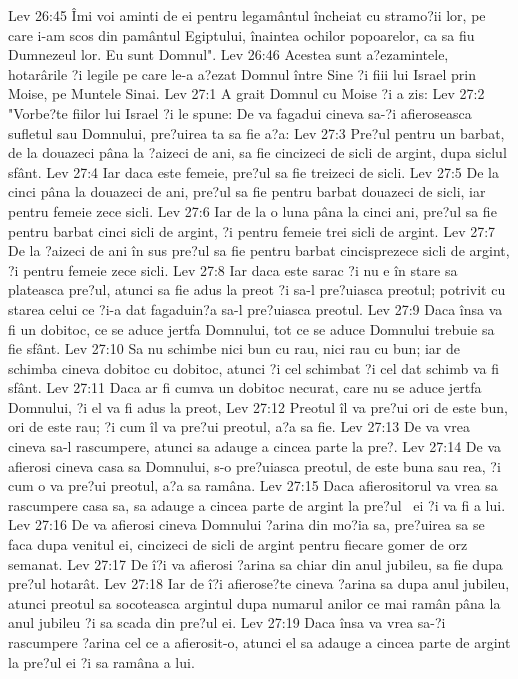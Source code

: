 Lev 26:45  Îmi voi aminti de ei pentru legamântul încheiat cu stramo?ii lor, pe care i-am scos din pamântul Egiptului, înaintea ochilor popoarelor, ca sa fiu Dumnezeul lor. Eu sunt Domnul".
Lev 26:46  Acestea sunt a?ezamintele, hotarârile ?i legile pe care le-a a?ezat Domnul între Sine ?i fiii lui Israel prin Moise, pe Muntele Sinai.
Lev 27:1  A grait Domnul cu Moise ?i a zis:
Lev 27:2  "Vorbe?te fiilor lui Israel ?i le spune: De va fagadui cineva sa-?i afieroseasca sufletul sau Domnului, pre?uirea ta sa fie a?a:
Lev 27:3  Pre?ul pentru un barbat, de la douazeci pâna la ?aizeci de ani, sa fie cincizeci de sicli de argint, dupa siclul sfânt.
Lev 27:4  Iar daca este femeie, pre?ul sa fie treizeci de sicli.
Lev 27:5  De la cinci pâna la douazeci de ani, pre?ul sa fie pentru barbat douazeci de sicli, iar pentru femeie zece sicli.
Lev 27:6  Iar de la o luna pâna la cinci ani, pre?ul sa fie pentru barbat cinci sicli de argint, ?i pentru femeie trei sicli de argint.
Lev 27:7  De la ?aizeci de ani în sus pre?ul sa fie pentru barbat cincisprezece sicli de argint, ?i pentru femeie zece sicli.
Lev 27:8  Iar daca este sarac ?i nu e în stare sa plateasca pre?ul, atunci sa fie adus la preot ?i sa-l pre?uiasca preotul; potrivit cu starea celui ce ?i-a dat fagaduin?a sa-l pre?uiasca preotul.
Lev 27:9  Daca însa va fi un dobitoc, ce se aduce jertfa Domnului, tot ce se aduce Domnului trebuie sa fie sfânt.
Lev 27:10  Sa nu schimbe nici bun cu rau, nici rau cu bun; iar de schimba cineva dobitoc cu dobitoc, atunci ?i cel schimbat ?i cel dat schimb va fi sfânt.
Lev 27:11  Daca ar fi cumva un dobitoc necurat, care nu se aduce jertfa Domnului, ?i el va fi adus la preot,
Lev 27:12  Preotul îl va pre?ui ori de este bun, ori de este rau; ?i cum îl va pre?ui preotul, a?a sa fie.
Lev 27:13  De va vrea cineva sa-l rascumpere, atunci sa adauge a cincea parte la pre?.
Lev 27:14  De va afierosi cineva casa sa Domnului, s-o pre?uiasca preotul, de este buna sau rea, ?i cum o va pre?ui preotul, a?a sa ramâna.
Lev 27:15  Daca afierositorul va vrea sa rascumpere casa sa, sa adauge a cincea parte de argint la pre?ul  ei ?i va fi a lui.
Lev 27:16  De va afierosi cineva Domnului ?arina din mo?ia sa, pre?uirea sa se faca dupa venitul ei, cincizeci de sicli de argint pentru fiecare gomer de orz semanat.
Lev 27:17  De î?i va afierosi ?arina sa chiar din anul jubileu, sa fie dupa pre?ul hotarât.
Lev 27:18  Iar de î?i afierose?te cineva ?arina sa dupa anul jubileu, atunci preotul sa socoteasca argintul dupa numarul anilor ce mai ramân pâna la anul jubileu ?i sa scada din pre?ul ei.
Lev 27:19  Daca însa va vrea sa-?i rascumpere ?arina cel ce a afierosit-o, atunci el sa adauge a cincea parte de argint la pre?ul ei ?i sa ramâna a lui.
